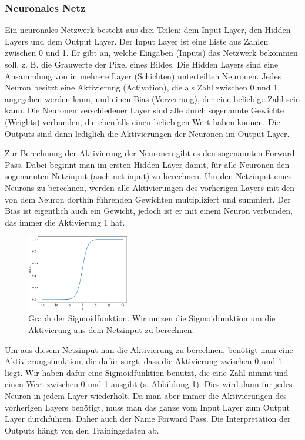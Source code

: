 \documentclass[11pt]{scrartcl}
\begin{document}
	\subsubsection{Neuronales Netz}

	Ein neuronales Netzwerk besteht aus drei Teilen: dem Input Layer, den Hidden Layers und dem Output Layer. 
	Der Input Layer ist eine Liste aus Zahlen zwischen 0 und 1. Er gibt an, welche Eingaben (Inputs) das Netzwerk bekommen soll, z. B. die Grauwerte der Pixel eines Bildes.
	Die Hidden Layers sind eine Ansammlung von in mehrere Layer (Schichten) unterteilten Neuronen.
	Jedes Neuron besitzt eine Aktivierung (Activation), die als Zahl zwischen 0 und 1 angegeben werden kann, und einen Bias (Verzerrung), der eine beliebige Zahl sein kann. Die Neuronen verschiedener Layer sind alle durch sogenannte Gewichte (Weights) verbunden, die ebenfalls einen beliebigen Wert haben können.
	Die Outputs sind dann lediglich die Aktivierungen der Neuronen im Output Layer.


	Zur Berechnung der Aktivierung der Neuronen gibt es den sogenannten Forward Pass. Dabei beginnt man im ersten Hidden Layer damit, für alle Neuronen den sogenannten Netzinput (auch net input) zu berechnen. Um den Netzinput eines Neurons zu berechnen, werden alle Aktivierungen des vorherigen Layers mit den von dem Neuron dorthin führenden Gewichten multipliziert und summiert. Der Bias ist eigentlich auch ein Gewicht, jedoch ist er mit einem Neuron verbunden, das immer die Aktivierung 1 hat.

	\begin{figure}
		\centering
		\vspace*{-5mm}
		\includegraphics[width=0.4\textwidth]{pictures/sig_func.png}
		\caption{Graph der Sigmoidfunktion. Wir nutzen die Sigmoidfunktion um die Aktivierung aus dem Netzinput zu berechnen.}
		\label{sig_func}
	\end{figure}

	Um aus diesem Netzinput nun die Aktivierung zu berechnen, benötigt man eine Aktivierungsfunktion, die dafür sorgt, dass die Aktivierung zwischen 0 und 1 liegt. Wir haben dafür eine Sigmoidfunktion benutzt, die eine Zahl nimmt und einen Wert zwischen 0 und 1 ausgibt (s. Abbildung \ref{sig_func}). Dies wird dann für jedes Neuron in jedem Layer wiederholt. Da man aber immer die Aktivierungen des vorherigen Layers benötigt, muss man das ganze vom Input Layer zum Output Layer durchführen. Daher auch der Name Forward Pass. Die Interpretation der Outputs hängt von den Trainingsdaten ab.
	
\end{document}
